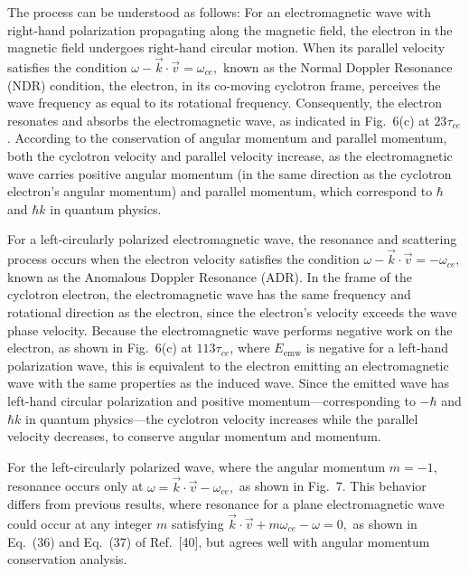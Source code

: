 \documentclass{cpbtex3}
\begin{document}
The process can be understood as follows: For an electromagnetic wave with right-hand polarization propagating along the magnetic field, the electron in the magnetic field undergoes right-hand circular motion. When its parallel velocity satisfies the condition
\(
\omega - \vec{k} \cdot \vec{v} = \omega_{ce},
\)
known as the Normal Doppler Resonance (NDR) condition, the electron, in its co-moving cyclotron frame, perceives the wave frequency as equal to its rotational frequency. Consequently, the electron resonates and absorbs the electromagnetic wave, as indicated in Fig.~6(c) at \( 23\tau_{ce} \). According to the conservation of angular momentum and parallel momentum, both the cyclotron velocity and parallel velocity increase, as the electromagnetic wave carries positive angular momentum (in the same direction as the cyclotron electron's angular momentum) and parallel momentum, which correspond to \( \hbar \) and \( \hbar k \) in quantum physics.

For a left-circularly polarized electromagnetic wave, the resonance and scattering process occurs when the electron velocity satisfies the condition
\(
\omega - \vec{k} \cdot \vec{v} = -\omega_{ce},
\)
known as the Anomalous Doppler Resonance (ADR). In the frame of the cyclotron electron, the electromagnetic wave has the same frequency and rotational direction as the electron, since the electron's velocity exceeds the wave phase velocity. Because the electromagnetic wave performs negative work on the electron, as shown in Fig.~6(c) at \( 113\tau_{ce} \), where \( E_{\text{emw}} \) is negative for a left-hand polarization wave, this is equivalent to the electron emitting an electromagnetic wave with the same properties as the induced wave. Since the emitted wave has left-hand circular polarization and positive momentum---corresponding to \( -\hbar \) and \( \hbar k \) in quantum physics---the cyclotron velocity increases while the parallel velocity decreases, to conserve angular momentum and momentum.

For the left-circularly polarized wave, where the angular momentum \( m = -1 \), resonance occurs only at
\(
\omega = \vec{k} \cdot \vec{v} - \omega_{ce},
\)
as shown in Fig.~7. This behavior differs from previous results, where resonance for a plane electromagnetic wave could occur at any integer \( m \) satisfying
\(
\vec{k} \cdot \vec{v} + m\omega_{ce} - \omega = 0,
\)
as shown in Eq.~(36) and Eq.~(37) of Ref.~[40], but agrees well with angular momentum conservation analysis.
\end{document}
